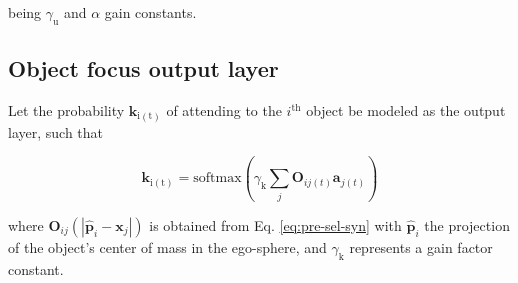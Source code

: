 \documentclass[letterpaper, 10 pt, conference]{ieeeconf}  %
\begin{document}
	\noindent being $\gamma_\mathrm{u}$ and $\alpha$ gain constants.
	
	\subsection{Object focus output layer}
	
	Let the probability $\mathbf{k}_\mathrm{i(t)}$ of attending to the $i^\mathrm{th}$ object be modeled as the output layer, such that
	
	\begin{equation}
	\mathbf{k}_\mathrm{i(t)} = \mathrm{softmax}\left(\gamma_{\mathrm{k}}\sum_{j}^{} \mathbf{O}_{ij(t)}\mathbf{a}_{j(t)}\right)
	\label{eq:out}
	\end{equation}
	
	\noindent where $\mathbf{O}_{ij}(|\mathbf{\hat{p}}_i-\mathbf{x}_j|)$ is obtained from Eq. \eqref{eq:pre-sel-syn} with $\mathbf{\hat{p}}_i$ the projection of the object's center of mass in the ego-sphere, and $\gamma_{\mathrm{k}}$ represents a gain factor constant.
	


	

%	
%			
%	
	
\end{document}
